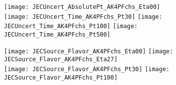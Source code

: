 \documentclass[landscape,10pt]{beamer} %
\begin{document}
\newpage

\begin{figure}[p]
\centering
  \texttt{[image: JECUncert\_AbsolutePt\_AK4PFchs\_Eta00]}\\
  \texttt{[image: JECUncert\_Time\_AK4PFchs\_Pt30]}
  \texttt{[image: JECUncert\_Time\_AK4PFchs\_Pt100]}
  \texttt{[image: JECUncert\_Time\_AK4PFchs\_Pt500]}
\end{figure}

\newpage

\begin{figure}[p]
\centering
\texttt{[image: JECSource\_Flavor\_AK4PFchs\_Eta00]}
\texttt{[image: JECSource\_Flavor\_AK4PFchs\_Eta27]}\\
\texttt{[image: JECSource\_Flavor\_AK4PFchs\_Pt30]}
\texttt{[image: JECSource\_Flavor\_AK4PFchs\_Pt100]}
\end{figure}
\end{document}
